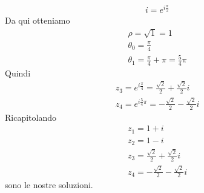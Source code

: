 \begin{example}
\begin{gather*}
		i = e^{i \frac{\pi}{2}}
	\end{gather*}
	Da qui otteniamo
	\begin{gather*}
		\rho = \sqrt{1} = 1      \\
		\theta_0 = \frac{\pi}{4} \\
		\theta_1 = \frac{\pi}{4} + \pi = \frac{5}{4} \pi
	\end{gather*}
	Quindi
	\begin{gather*}
		z_3 = e^{i \frac{\pi}{4}} = \frac{\sqrt{2}}{2} + \frac{\sqrt{2}}{2} i \\
		z_4 = e^{i \frac{5}{4} \pi} = -\frac{\sqrt{2}}{2} - \frac{\sqrt{2}}{2} i
	\end{gather*}
	Ricapitolando
	\begin{gather*}
		z_1 = 1 + i                                     \\
		z_2 = 1 - i                                     \\
		z_3 = \frac{\sqrt{2}}{2} + \frac{\sqrt{2}}{2} i \\
		z_4 = -\frac{\sqrt{2}}{2} - \frac{\sqrt{2}}{2} i
	\end{gather*}
	sono le nostre soluzioni.
\end{example}

